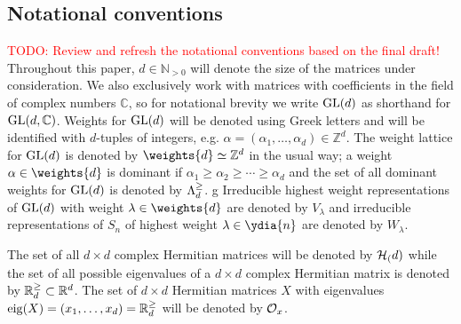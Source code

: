 \documentclass[notitlepage, 10pt]{article}
\begin{document}
\begin{rem}
{        %
    }
\end{rem}

\subsection{Notational conventions}
\textcolor{red}{TODO: Review and refresh the notational conventions based on the final draft!}
Throughout this paper, $d \in \mathbb N_{>0}$ will denote the size of the matrices under consideration.
We also exclusively work with matrices with coefficients in the field of complex numbers $\mathbb C$, so for notational brevity we write $\operatorname{GL}(d)$ as shorthand for $\operatorname{GL}(d, \mathbb C)$.
Weights for $\operatorname{GL}(d)$ will be denoted using Greek letters and will be identified with $d$-tuples of integers, e.g. $\alpha = (\alpha_1, \ldots, \alpha_d) \in \mathbb Z^{d}$.
The weight lattice for $\operatorname{GL}(d)$ is denoted by $\weights{d} \simeq \mathbb Z^{d}$ in the usual way; a weight $\alpha \in \weights{d}$ is dominant if $\alpha_1 \geq \alpha_2 \geq \cdots \geq \alpha_d$ and the set of all dominant weights for $\operatorname{GL}(d)$ is denoted by $\Lambda^{\geq}_{d}$.
g
Irreducible highest weight representations of $\operatorname{GL}(d)$ with weight $\lambda \in \weights{d}$ are denoted by $V_{\lambda}$ and irreducible representations of $S_n$ of highest weight $\lambda \in \ydia{n}$ are denoted by $W_{\lambda}$.

The set of all $d\times d$ complex Hermitian matrices will be denoted by $\mathcal H_{(}d)$ while the set of all possible eigenvalues of a $d\times d$ complex Hermitian matrix is denoted by $\mathbb R^{\geq}_{d} \subset \mathbb R^{d}$.
The set of $d\times d$ Hermitian matrices $X$ with eigenvalues $\operatorname{eig}(X) = (x_1, \ldots, x_d) = \mathbb R^{\geq}_{d}$ will be denoted by $\mathcal O_x$. 

\clearpage
\end{document}
